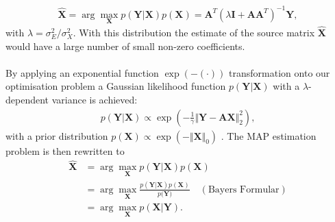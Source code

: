 \begin{align*}
\hat{\mathbf{X}} = \arg \max_{\mathbf{X}} p(\mathbf{Y} \vert \mathbf{X}) p(\mathbf{X}) = \mathbf{A}^T (\lambda \mathbf{I} + \mathbf{AA}^T)^{-1} \mathbf{Y},
\end{align*}
with $\lambda = \sigma_E^2 / \sigma_X^2$. With this distribution the estimate of the source matrix $\hat{\mathbf{X}}$ would have a large number of small non-zero coefficients.
\\ \\
By applying an exponential function $\exp(- (\cdot))$ transformation onto our optimisation problem a Gaussian likelihood function $p(\mathbf{Y} \vert \mathbf{X})$ with a $\lambda$-dependent variance is achieved:
\begin{align*}
p(\mathbf{Y} \vert \mathbf{X}) \propto \exp \left( - \frac{1}{\gamma} \Vert \mathbf{Y} - \mathbf{AX} \Vert_2^2 \right),
\end{align*}
with a prior distribution $p(\mathbf{X}) \propto \exp(- \Vert \mathbf{X} \Vert_0)$ \cite[p. 137]{??}. The MAP estimation problem is then rewritten to
\begin{align*}
\hat{\mathbf{X}} &= \arg \max_{\mathbf{X}} p(\mathbf{Y} \vert \mathbf{X}) p(\mathbf{X}) \\
&= \arg \max_{\mathbf{X}} \frac{p(\mathbf{Y} \vert \mathbf{X}) p(\mathbf{X})}{p(\mathbf{Y)}} \quad (\text{Bayers Formular}) \\
&= \arg \max_{\mathbf{X}} p(\mathbf{X} \vert \mathbf{Y}).
\end{align*}

